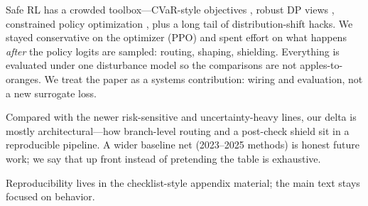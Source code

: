 Safe RL has a crowded toolbox---CVaR-style objectives \cite{chow2015cvar}, robust DP views \cite{iyengar2005robust}, constrained policy optimization \cite{achiam2017cpo}, plus a long tail of distribution-shift hacks. We stayed conservative on the optimizer (PPO) and spent effort on what happens \emph{after} the policy logits are sampled: routing, shaping, shielding. Everything is evaluated under one disturbance model so the comparisons are not apples-to-oranges. We treat the paper as a systems contribution: wiring and evaluation, not a new surrogate loss.

Compared with the newer risk-sensitive and uncertainty-heavy lines, our delta is mostly architectural---how branch-level routing and a post-check shield sit in a reproducible pipeline. A wider baseline net (2023--2025 methods) is honest future work; we say that up front instead of pretending the table is exhaustive.

Reproducibility lives in the checklist-style appendix material; the main text stays focused on behavior.
